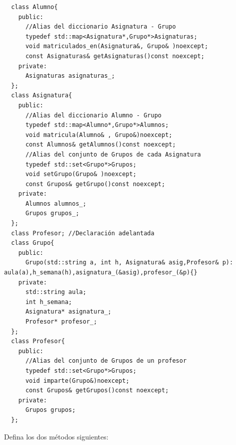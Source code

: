 \begin{verbatim}
  class Alumno{
    public:
      //Alias del diccionario Asignatura - Grupo
      typedef std::map<Asignatura*,Grupo*>Asignaturas;
      void matriculados_en(Asignatura&, Grupo& )noexcept;
      const Asignaturas& getAsignaturas()const noexcept;
    private:
      Asignaturas asignaturas_;
  };
  class Asignatura{
    public:
      //Alias del diccionario Alumno - Grupo
      typedef std::map<Alumno*,Grupo*>Alumnos;
      void matricula(Alumno& , Grupo&)noexcept;
      const Alumnos& getAlumnos()const noexcept;
      //Alias del conjunto de Grupos de cada Asignatura
      typedef std::set<Grupo*>Grupos;
      void setGrupo(Grupo& )noexcept;
      const Grupos& getGrupo()const noexcept;
    private:
      Alumnos alumnos_;
      Grupos grupos_;
  };
  class Profesor; //Declaración adelantada
  class Grupo{
    public:
      Grupo(std::string a, int h, Asignatura& asig,Profesor& p): aula(a),h_semana(h),asignatura_(&asig),profesor_(&p){}
    private:  
      std::string aula;
      int h_semana;
      Asignatura* asignatura_;
      Profesor* profesor_;
  };
  class Profesor{
    public:
      //Alias del conjunto de Grupos de un profesor
      typedef std::set<Grupo*>Grupos;
      void imparte(Grupo&)noexcept;
      const Grupos& getGrupos()const noexcept;
    private:
      Grupos grupos;
  };

\end{verbatim}

 Defina los dos métodos siguientes:

